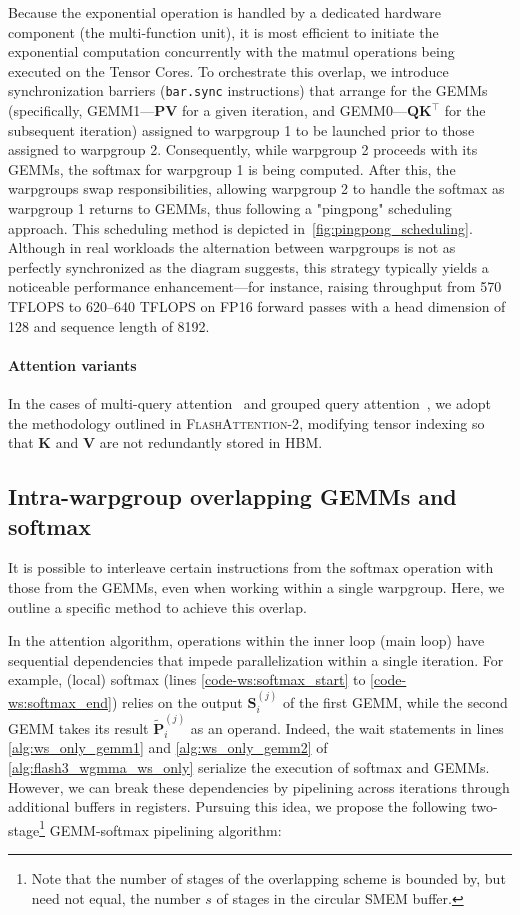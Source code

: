 \begin{enumerate}
Because the exponential operation is handled by a dedicated hardware component (the multi-function unit), it is most efficient to initiate the exponential computation concurrently with the matmul operations being executed on the Tensor Cores. To orchestrate this overlap, we introduce synchronization barriers (\texttt{bar.sync} instructions) that arrange for the GEMMs (specifically, GEMM1—$\mathbf{P} \mathbf{V}$ for a given iteration, and GEMM0—$\mathbf{Q} \mathbf{K}^\top$ for the subsequent iteration) assigned to warpgroup 1 to be launched prior to those assigned to warpgroup 2. Consequently, while warpgroup 2 proceeds with its GEMMs, the softmax for warpgroup 1 is being computed. After this, the warpgroups swap responsibilities, allowing warpgroup 2 to handle the softmax as warpgroup 1 returns to GEMMs, thus following a "pingpong" scheduling approach. This scheduling method is depicted in~\cref{fig:pingpong_scheduling}. Although in real workloads the alternation between warpgroups is not as perfectly synchronized as the diagram suggests, this strategy typically yields a noticeable performance enhancement—for instance, raising throughput from 570 TFLOPS to 620–640 TFLOPS on FP16 forward passes with a head dimension of 128 and sequence length of 8192.

\paragraph{Attention variants} In the cases of multi-query attention~\citep{shazeer2019fast} and grouped query attention~\citep{ainslie2023gqa}, we adopt the methodology outlined in \textsc{FlashAttention-2}, modifying tensor indexing so that $\mathbf{K}$ and $\mathbf{V}$ are not redundantly stored in HBM.

\subsection{Intra-warpgroup overlapping GEMMs and softmax}

It is possible to interleave certain instructions from the softmax operation with those from the GEMMs, even when working within a single warpgroup. Here, we outline a specific method to achieve this overlap.

In the attention algorithm, operations within the inner loop (main loop) have sequential dependencies that impede parallelization within a single iteration. For example, (local) softmax (lines \ref{code-ws:softmax_start} to \ref{code-ws:softmax_end}) relies on the output $\mathbf{S}_i^{(j)}$ of the first GEMM, while the second GEMM takes its result $\widetilde{\mathbf{P}}_i^{(j)}$ as an operand. Indeed, the wait statements in lines \ref{alg:ws_only_gemm1} and \ref{alg:ws_only_gemm2} of \cref{alg:flash3_wgmma_ws_only} serialize the execution of softmax and GEMMs. However, we can break these dependencies by pipelining across iterations through additional buffers in registers. Pursuing this idea, we propose the following two-stage\footnote{Note that the number of stages of the overlapping scheme is bounded by, but need not equal, the number $s$ of stages in the circular SMEM buffer.} GEMM-softmax pipelining algorithm:


\end{enumerate}
